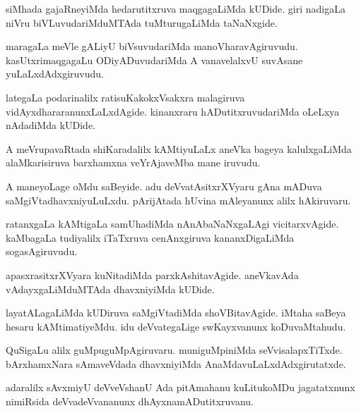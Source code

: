 \documentclass{article}
\begin{document}
\begin{mn}
siMhada gajaRneyiMda hedarutitxruva maqgagaLiMda kUDide. giri nadigaLa
niVru biVLuvudariMduMTAda tuMturugaLiMda taNaNxgide.
\end{mn}

\begin{mn}
maragaLa meVle gALiyU biVsuvudariMda
manoVharavAgiruvudu. kasUtxrimaqgagaLu ODiyADuvudariMda A vanavelalxvU
suvAsane yuLaLxdAdxgiruvudu.
\end{mn}

\begin{mn}
lategaLa podarinalilx ratisuKakokxVsakxra malagiruva
vidAyxdhararanunxLaLxdAgide. kinanxraru hADutitxruvudariMda oLeLxya
nAdadiMda kUDide.
\end{mn}

\begin{mn}
A meVrupavaRtada shiKaradalilx kAMtiyuLaLx aneVka bageya kalulxgaLiMda
alaMkarisiruva barxhamxna veYrAjaveMba mane iruvudu.
\end{mn}

\begin{mn}%
A maneyoLage oMdu saBeyide. adu deVvatAsitxrXVyaru gAna mADuva
saMgiVtadhavxniyuLuLxdu. pArijAtada hUvina mAleyanunx alilx hAkiruvaru.
\end{mn}

\begin{mn}
ratanxgaLa kAMtigaLa samUhadiMda nAnAbaNaNxgaLAgi
vicitarxvAgide. kaMbagaLa tudiyalilx iTaTxruva cenAnxgiruva
kananxDigaLiMda sogasAgiruvudu.
\end{mn}

\begin{mn}
apasxrasitxrXVyara kuNitadiMda parxkAshitavAgide. aneVkavAda
vAdayxgaLiMduMTAda dhavxniyiMda kUDide.
\end{mn}

\begin{mn}
layatALagaLiMda kUDiruva saMgiVtadiMda shoVBitavAgide. iMtaha saBeya
hesaru kAMtimatiyeMdu. idu deVvategaLige swKayxvanunx koDuvaMtahudu.
\end{mn}

\begin{mn}%
QuSigaLu alilx guMpuguMpAgiruvaru. muniguMpiniMda
seVvisalapxTiTxde. bArxhamxNara sAmaveVdada dhavxniyiMda AnaMdavuLaLxdAdxgirutatxde.
\end{mn}

\begin{mn}%
adaralilx sAvxmiyU deVveVshanU Ada pitAmahanu kuLitukoMDu jagatatxnunx
nimiRsida deVvadeVvananunx dhAyxnamADutitxruvanu.
\end{mn}
\end{document}
